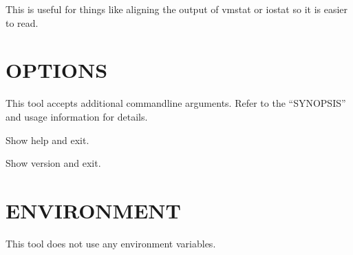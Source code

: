 \documentclass[letterpaper,10pt,english]{sphinxmanual}
\begin{document}
\sphinxAtStartPar
This is useful for things like aligning the output of vmstat or iostat so it
is easier to read.


\section{OPTIONS}
\label{\detokenize{mariadb-align-output:options}}
\sphinxAtStartPar
This tool accepts additional command\sphinxhyphen{}line arguments.  Refer to the
“SYNOPSIS” and usage information for details.

\begin{fulllineitems}
\label{\detokenize{mariadb-align-output:cmdoption-mariadb-align-output-help}}
\sphinxAtStartPar
Show help and exit.

\end{fulllineitems}


\begin{fulllineitems}
\label{\detokenize{mariadb-align-output:cmdoption-mariadb-align-output-version}}
\sphinxAtStartPar
Show version and exit.

\end{fulllineitems}



\section{ENVIRONMENT}
\label{\detokenize{mariadb-align-output:environment}}
\sphinxAtStartPar
This tool does not use any environment variables.
\end{document}
